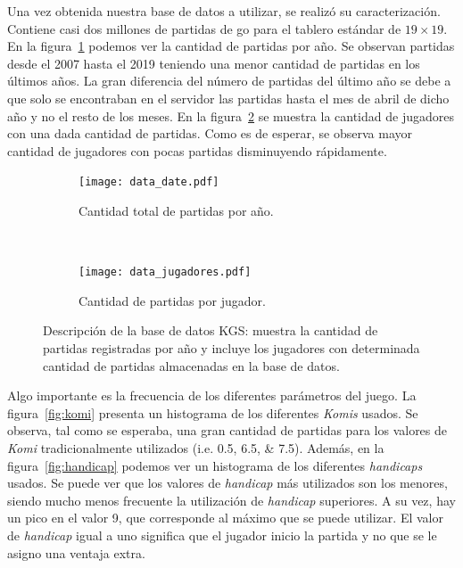 \documentclass[11pt,twoside,spanish]{report} %
\begin{document}
Una vez obtenida nuestra base de datos a utilizar, se realiz\'o su caracterizaci\'on.
Contiene casi dos millones de partidas de go para el tablero est\'andar de $19\times19$.
En la figura~\ref{fig:data} podemos ver la cantidad de partidas por a\~no.
Se observan partidas desde el 2007 hasta el 2019 teniendo una menor cantidad de partidas en los \'ultimos a\~nos.
La gran diferencia del n\'umero de partidas del \'ultimo a\~no se debe a que solo se encontraban en el servidor las partidas hasta el mes de abril de dicho a\~no y no el resto de los meses.
En la figura~\ref{fig:jugadores} se muestra la cantidad de jugadores con una dada cantidad de partidas.
Como es de esperar, se observa mayor cantidad de jugadores con pocas partidas disminuyendo r\'apidamente.

\begin{figure}[H]
	\centering
	\begin{subfigure}[t]{.49\textwidth}
		\centering
		\texttt{[image: data\_date.pdf]}
		\caption{Cantidad total de partidas por a\~no.}
		\label{fig:data}
	\end{subfigure}
	~
	\begin{subfigure}[t]{.49\textwidth}
		\centering
		\texttt{[image: data\_jugadores.pdf]}
		\caption{Cantidad de partidas por jugador.}
		\label{fig:jugadores}
	\end{subfigure}
	\caption{Descripci\'on de la base de datos KGS:  muestra la cantidad de partidas registradas por a\~no y  incluye los jugadores con determinada cantidad de partidas almacenadas en la base de datos. }
	\label{fig:dataJugadores}
\end{figure}



Algo importante es la frecuencia de los diferentes par\'ametros del juego.
La figura~\ref{fig:komi} presenta un histograma de los diferentes \textit{Komis} usados.
Se observa, tal como se esperaba, una gran cantidad de partidas para los valores de \textit{Komi} tradicionalmente utilizados (i.e. \numlist{0.5;6.5;7.5}).
Adem\'as, en la figura~\ref{fig:handicap} podemos ver un histograma de los diferentes \textit{handicaps} usados.
Se puede ver que los valores de \emph{handicap} m\'as utilizados son los menores, siendo mucho menos frecuente la utilizaci\'on de \emph{handicap} superiores.
A su vez, hay un pico en el valor 9, que corresponde al m\'aximo que se puede utilizar.
El valor de \emph{handicap} igual a uno significa que el jugador inicio la partida  y no que se le asigno una ventaja extra.
\end{document}
